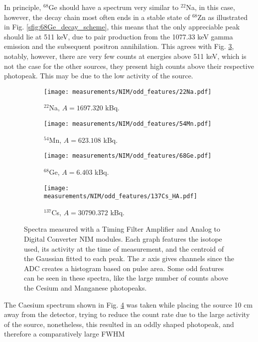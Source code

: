 In principle, $^{68}$Ge should have a spectrum very similar to $^{22}$Na, in this case, however, the decay chain most often ends in a stable state of $^{68}$Zn as illustrated in Fig. \ref{sfig:68Ge_decay_scheme}, this means that the only appreciable peak should lie at 511 \unit{\kilo\eV}, due to pair production from the 1077.33 \unit{\kilo\eV} gamma emission and the subsequent positron annihilation. This agrees with Fig. \ref{sfig:NIM_odd_68Ge}, notably, however, there are very few counts at energies above 511 \unit{\kilo\eV}, which is not the case for the other sources, they present high counts above their respective photopeak. This may be due to the low activity of the source. 

\begin{figure}[H]
  \begin{subfigure}[t]{0.47\textwidth}
    \centering
    \texttt{[image: measurements/NIM/odd\_features/22Na.pdf]}
    \caption{\label{sfig:NIM_odd_22Na}$^{22}$Na, $A=1697.320$ kBq.}
  \end{subfigure}
  \hfill
  \begin{subfigure}[t]{0.47\textwidth}
    \centering
    \texttt{[image: measurements/NIM/odd\_features/54Mn.pdf]}
    \caption{\label{sfig:NIM_odd_54Mn}$^{54}$Mn, $A=623.108$ kBq.}
  \end{subfigure}
  \medskip
  \begin{subfigure}[t]{0.47\textwidth}
    \centering
    \texttt{[image: measurements/NIM/odd\_features/68Ge.pdf]}
    \caption{\label{sfig:NIM_odd_68Ge}$^{68}$Ge, $A=6.403$ kBq.}
  \end{subfigure}
  \hfill
  \begin{subfigure}[t]{0.47\textwidth}
    \centering
    \texttt{[image: measurements/NIM/odd\_features/137Cs\_HA.pdf]}
    \caption{\label{sfig:NIM_odd_137Cs}$^{137}$Cs, $A=30790.372$ kBq.}
  \end{subfigure}
  \caption{\label{fig:NIM_odd_features}Spectra measured with a Timing Filter Amplifier and Analog to Digital Converter NIM modules. Each graph features the isotope used, its activity at the time of measurement, and the centroid of the Gaussian fitted to each peak. The $x$ axis gives channels since the ADC creates a histogram based on pulse area. Some odd features can be seen in these spectra, like the large number of counts above the Cesium and Manganese photopeaks.}
\end{figure}

The Caesium spectrum shown in Fig. \ref{sfig:NIM_odd_137Cs} was taken while placing the source 10 cm away from the detector, trying to reduce the count rate due to the large activity of the source, nonetheless, this resulted in an oddly shaped photopeak, and therefore a comparatively large FWHM

